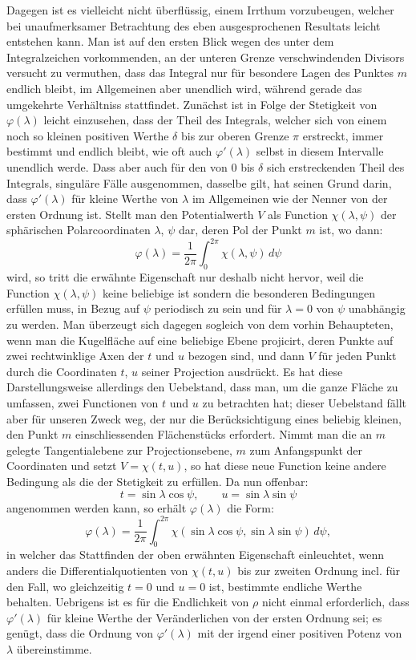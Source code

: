 \documentclass[11pt]{article}
\newcommand{\dd}{\,d}
\begin{document}
Dagegen ist es vielleicht nicht überflüssig, einem Irrthum vorzubeugen, welcher bei unaufmerksamer Betrachtung des eben ausgesprochenen Resultats leicht entstehen kann. Man ist auf den ersten Blick wegen des unter dem Integralzeichen vorkommenden, an der unteren Grenze verschwindenden Divisors versucht zu vermuthen, dass das Integral nur für besondere Lagen des Punktes $m$ endlich bleibt, im Allgemeinen aber unendlich wird, während gerade das umgekehrte Verhältniss stattfindet. Zunächst ist in Folge der Stetigkeit von $\varphi(\lambda)$ leicht einzusehen, dass der Theil des Integrals, welcher sich von einem noch so kleinen positiven Werthe $\delta$ bis zur oberen Grenze $\pi$ erstreckt, immer bestimmt und endlich bleibt, wie oft auch $\varphi'(\lambda)$ selbst in diesem Intervalle unendlich werde. Dass aber auch für den von $0$ bis $\delta$ sich erstreckenden Theil des Integrals, singuläre Fälle ausgenommen, dasselbe gilt, hat seinen Grund darin, dass $\varphi'(\lambda)$ für kleine Werthe von $\lambda$ im Allgemeinen wie der Nenner von der ersten Ordnung ist. Stellt man den Potentialwerth $V$ als Function $\chi(\lambda,\psi)$ der sphärischen Polarcoordinaten $\lambda$, $\psi$ dar, deren Pol der Punkt $m$ ist, wo dann:
\[
 \varphi(\lambda)=\frac1{2\pi}\int_0^{2\pi}\chi(\lambda,\psi)\dd\psi
\]
wird, so tritt die erwähnte Eigenschaft nur deshalb nicht hervor, weil die Function $\chi(\lambda,\psi)$ keine beliebige ist sondern die besonderen Bedingungen erfüllen muss, in Bezug auf $\psi$ periodisch zu sein und für $\lambda=0$ von $\psi$ unabhängig zu werden. Man überzeugt sich dagegen sogleich von dem vorhin Behaupteten, wenn man die Kugelfläche auf eine beliebige Ebene projicirt, deren Punkte auf zwei rechtwinklige Axen der $t$ und $u$ bezogen sind, und dann $V$ für jeden Punkt durch die Coordinaten $t$, $u$ seiner Projection ausdrückt. Es hat diese Darstellungsweise allerdings den Uebelstand, dass man, um die ganze Fläche zu umfassen, zwei Functionen von $t$ und $u$ zu betrachten hat; dieser Uebelstand fällt aber für unseren Zweck weg, der nur die Berücksichtigung eines beliebig kleinen, den Punkt $m$ einschliessenden Flächenstücks erfordert. Nimmt man die an $m$ gelegte Tangentialebene zur Projectionsebene, $m$ zum Anfangspunkt der Coordinaten und setzt $V=\chi(t,u)$, so hat diese neue Function keine andere Bedingung als die der Stetigkeit zu erfüllen. Da nun offenbar:
\[
 t=\sin\lambda\cos\psi,\qquad u=\sin\lambda\sin\psi
\]
angenommen werden kann, so erhält $\varphi(\lambda)$ die Form:
\[
 \varphi(\lambda)=\frac1{2\pi}\int_0^{2\pi}\chi(\sin\lambda\cos\psi,\sin\lambda\sin\psi)\dd\psi,
\]
in welcher das Stattfinden der oben erwähnten Eigenschaft einleuchtet, wenn anders die Differentialquotienten von $\chi(t,u)$ bis zur zweiten Ordnung incl. für den Fall, wo gleichzeitig $t=0$ und $u=0$ ist, bestimmte endliche Werthe behalten. Uebrigens ist es für die Endlichkeit von $\rho$ nicht einmal erforderlich, dass $\varphi'(\lambda)$ für kleine Werthe der Veränderlichen von der ersten Ordnung sei; es genügt, dass die Ordnung von $\varphi'(\lambda)$ mit der irgend einer positiven Potenz von $\lambda$ übereinstimme.
\end{document}
